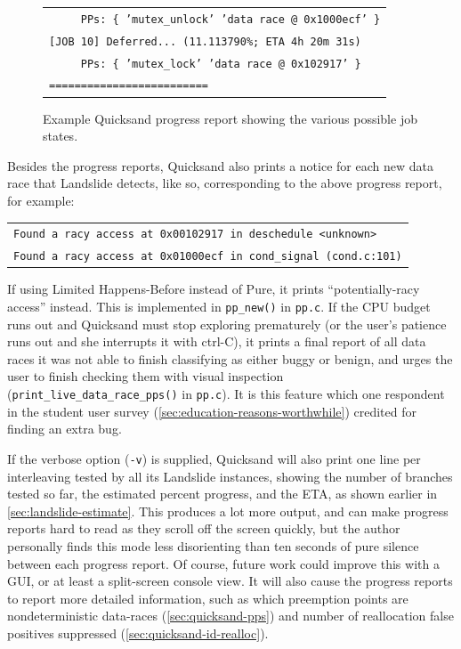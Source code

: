 \begin{figure}[t]
\begin{center}
\begin{tabular}{l}
		\texttt{~~~~ PPs: \{ 'mutex\_unlock' 'data race @ 0x1000ecf' \}} \\
		\texttt{[JOB 10] Deferred... (11.113790\%; ETA 4h 20m 31s)} \\
		\texttt{~~~~ PPs: \{ 'mutex\_lock' 'data race @ 0x102917' \}} \\
		\texttt{=========================} \\
	\end{tabular}
	\end{center}
	\caption{Example Quicksand progress report showing the various possible job states.}
	\label{fig:quicksand-progress}
\end{figure}

Besides the progress reports, Quicksand also prints a notice for each new data race that Landslide detects,
like so, corresponding to the above progress report, for example:
\begin{center}
	\begin{tabular}{l}
	{\tt Found a racy access at 0x00102917 in deschedule <unknown>} \\
	{\tt Found a racy access at 0x01000ecf in cond\_signal (cond.c:101)}
	\end{tabular}
\end{center}
If using Limited Happens-Before instead of Pure,
it prints ``potentially-racy access'' instead.
This is implemented in {\tt pp\_new()} in {\tt pp.c}.
If the CPU budget runs out and Quicksand must stop exploring prematurely
(or the user's patience runs out and she interrupts it with ctrl-C),
it prints a final report of all data races it was not able to finish classifying as either buggy or benign,
and urges the user to finish checking them with visual inspection
({\tt print\_live\_data\_race\_pps()} in {\tt pp.c}).
It is this feature which one respondent in the student user survey (\cref{sec:education-reasons-worthwhile})
credited for finding an extra bug.

If the verbose option ({\tt -v}) is supplied,
Quicksand will also print one line per interleaving tested by all its Landslide instances,
showing the number of branches tested so far, the estimated percent progress, and the ETA,
as shown earlier in \cref{sec:landslide-estimate}.
This produces a lot more output, and can make progress reports hard to read as they scroll off the screen quickly,
but the author personally finds this mode less disorienting than ten seconds of pure silence between each progress report.
Of course, future work could improve this with a GUI, or at least a split-screen console view.
It will also cause the progress reports to report more detailed information,
such as which preemption points are nondeterministic data-races (\cref{sec:quicksand-pps})
and number of reallocation false positives suppressed (\cref{sec:quicksand-id-realloc}).

